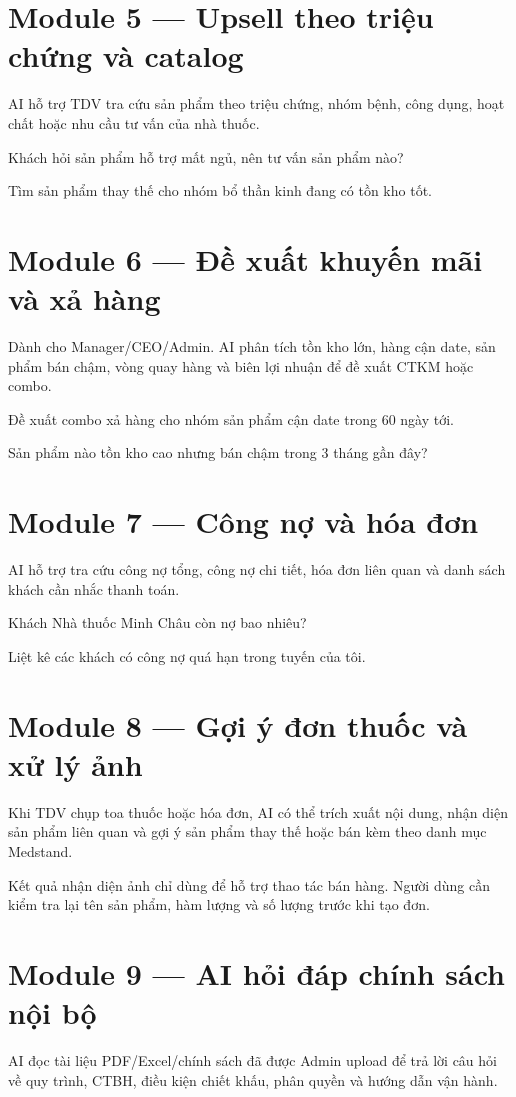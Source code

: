 \documentclass[12pt,a4paper,oneside,openany]{book}
\newcommand{\prompt}[1]{\begin{tcolorbox}[codeBox]#1\end{tcolorbox}}
\begin{document}
\section{Module 5 — Upsell theo triệu chứng và catalog}
AI hỗ trợ TDV tra cứu sản phẩm theo triệu chứng, nhóm bệnh, công dụng, hoạt chất hoặc nhu cầu tư vấn của nhà thuốc.

\prompt{Khách hỏi sản phẩm hỗ trợ mất ngủ, nên tư vấn sản phẩm nào?}
\prompt{Tìm sản phẩm thay thế cho nhóm bổ thần kinh đang có tồn kho tốt.}

\section{Module 6 — Đề xuất khuyến mãi và xả hàng}
Dành cho Manager/CEO/Admin. AI phân tích tồn kho lớn, hàng cận date, sản phẩm bán chậm, vòng quay hàng và biên lợi nhuận để đề xuất CTKM hoặc combo.

\prompt{Đề xuất combo xả hàng cho nhóm sản phẩm cận date trong 60 ngày tới.}
\prompt{Sản phẩm nào tồn kho cao nhưng bán chậm trong 3 tháng gần đây?}

\section{Module 7 — Công nợ và hóa đơn}
AI hỗ trợ tra cứu công nợ tổng, công nợ chi tiết, hóa đơn liên quan và danh sách khách cần nhắc thanh toán.

\prompt{Khách Nhà thuốc Minh Châu còn nợ bao nhiêu?}
\prompt{Liệt kê các khách có công nợ quá hạn trong tuyến của tôi.}

\section{Module 8 — Gợi ý đơn thuốc và xử lý ảnh}
Khi TDV chụp toa thuốc hoặc hóa đơn, AI có thể trích xuất nội dung, nhận diện sản phẩm liên quan và gợi ý sản phẩm thay thế hoặc bán kèm theo danh mục Medstand.

\begin{tcolorbox}[warnBox]
Kết quả nhận diện ảnh chỉ dùng để hỗ trợ thao tác bán hàng. Người dùng cần kiểm tra lại tên sản phẩm, hàm lượng và số lượng trước khi tạo đơn.
\end{tcolorbox}

\section{Module 9 — AI hỏi đáp chính sách nội bộ}
AI đọc tài liệu PDF/Excel/chính sách đã được Admin upload để trả lời câu hỏi về quy trình, CTBH, điều kiện chiết khấu, phân quyền và hướng dẫn vận hành.
\end{document}

